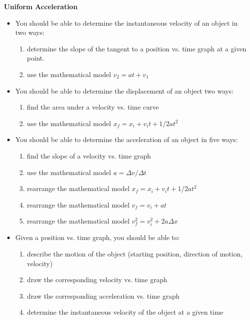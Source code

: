 {\bf Uniform Acceleration}
\begin{itemize}
\item You should be able to determine the instantaneous velocity of an object in two ways: 
\begin{enumerate}
\item determine the slope of the tangent to a position vs. time graph at a given point. 
\item use the mathematical model $v_2 =a t+v_1$
\end{enumerate}

\item You should be able to determine the displacement of an object two ways: 
\begin{enumerate}
\item find the area under a velocity vs. time curve 
\item use the mathematical model $x_f = x_i + v_i t + 1/2 a t^2$  
\end{enumerate}

\item You should be able to determine the acceleration of an object in five ways: 
\begin{enumerate}
\item find the slope of a velocity vs. time graph 
\item use the mathematical model $a=\Delta v /\Delta t $
\item rearrange the mathematical model $x_f = x_i  + v_i t + 1/2 a t^2$
\item rearrange the mathematical model $v_f = v_i + a t$
\item rearrange the mathematical model $v_f^2 =v_i^2 +2 a \Delta x$ 
\end{enumerate}

\item Given a position vs. time graph, you should be able to: 
\begin{enumerate}
\item describe the motion of the object (starting position, direction of motion, velocity) 
\item draw the corresponding velocity vs. time graph 
\item draw the corresponding acceleration vs. time graph 
\item determine the instantaneous velocity of the object at a given time 
\end{enumerate}


\end{itemize}
